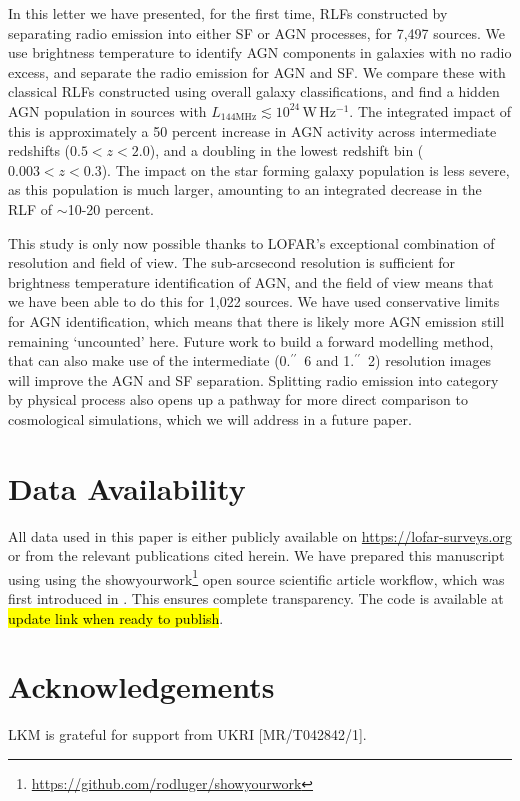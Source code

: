 \documentclass[usenatbib,fleqn,letters]{mnras}
\newcommand{\sarc}{$^{\prime\prime}\!\!$}
\newcommand{\wphz}{$\,$W$\,$Hz$^{-1}$}
\newcommand{\llof}{$L_{\textrm{144MHz}}$}
\begin{document}
In this letter we have presented, for the first time, RLFs constructed by separating radio emission into either SF or AGN processes, for 7,497 sources. We use brightness temperature to identify AGN components in galaxies with no radio excess, and separate the radio emission for AGN and SF. We compare these with classical RLFs constructed using overall galaxy classifications, and find a hidden AGN population in sources with \llof $\lesssim 10^{24}$\wphz . The integrated impact of this is approximately a 50 percent increase in AGN activity across intermediate redshifts ($0.5 < z < 2.0$), and a doubling in the lowest redshift bin ($0.003 < z < 0.3$). The impact on the star forming galaxy population is less severe, as this population is much larger, amounting to an integrated decrease in the RLF of $\sim$10-20 percent. 

This study is only now possible thanks to LOFAR's exceptional combination of resolution and field of view. The sub-arcsecond resolution is sufficient for brightness temperature identification of AGN, and the field of view means that we have been able to do this for 1,022 sources. We have used conservative limits for AGN identification, which means that there is likely more AGN emission still remaining `uncounted' here. Future work to build a forward modelling method, that can also make use of the intermediate (0.\sarc\ 6 and 1.\sarc\ 2) resolution images will improve the AGN and SF separation. Splitting radio emission into category by physical process also opens up a pathway for more direct comparison to cosmological simulations, which we will address in a future paper.

\vspace{-0.5in}

\section*{Data Availability}
All data used in this paper is either publicly available on \href{https://lofar-surveys.org}{https://lofar-surveys.org} or from the relevant publications cited herein. We have prepared this manuscript using using the showyourwork\footnote{ \href{https://github.com/rodluger/showyourwork}{https://github.com/rodluger/showyourwork}} open source scientific article workflow, which was first introduced in \cite{luger_mapping_2021}. This ensures complete transparency. The code is available at \hl{update link when ready to publish}. 

\section*{Acknowledgements}
LKM is grateful for support from UKRI [MR/T042842/1]. 
\end{document}

